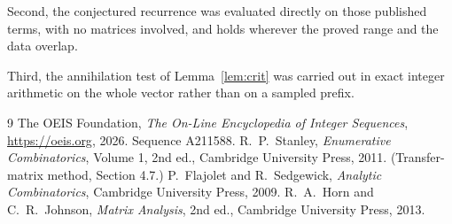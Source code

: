 \documentclass[11pt,a4paper]{article}
\theoremstyle{plain}
\theoremstyle{definition}
\begin{document}
Second, the conjectured recurrence was evaluated directly on those published terms, with no
matrices involved, and holds wherever the proved range and the data overlap.

Third, the annihilation test of Lemma~\ref{lem:crit} was carried out in exact integer
arithmetic on the whole vector rather than on a sampled prefix.

\begin{thebibliography}{9}
 The OEIS Foundation, \emph{The On-Line Encyclopedia of Integer
Sequences}, \url{https://oeis.org}, 2026. Sequence A211588.
 R.~P.~Stanley, \emph{Enumerative Combinatorics}, Volume 1, 2nd ed.,
Cambridge University Press, 2011. (Transfer-matrix method, Section 4.7.)
 P.~Flajolet and R.~Sedgewick, \emph{Analytic Combinatorics}, Cambridge
University Press, 2009.
 R.~A.~Horn and C.~R.~Johnson, \emph{Matrix Analysis}, 2nd ed., Cambridge
University Press, 2013.
\end{thebibliography}
\end{document}
